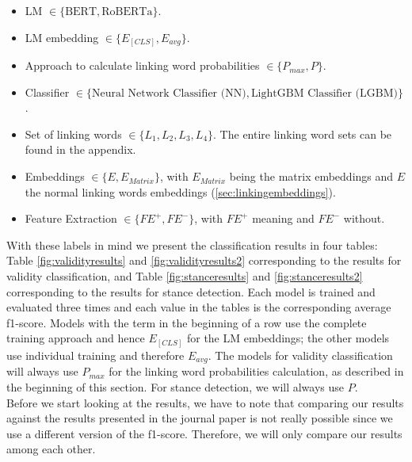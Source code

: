 \begin{itemize}
	\item LM $\in \{\text{BERT}, \text{RoBERTa}\}$.
	\item LM embedding $\in \{E_{[CLS]}, E_{avg}\}$.
	\item Approach to calculate linking word probabilities $\in \{P_{max}, P\}$.
	\item Classifier $\in \{\text{Neural Network Classifier (NN)}, \text{LightGBM Classifier (LGBM)}\}$.
	\item Set of linking words $\in \{L_1, L_2, L_3, L_4\}$. The entire linking word sets can be found in the appendix.
	\item Embeddings $\in \{E, E_{Matrix}\}$, with $E_{Matrix}$ being the matrix embeddings and $E$ the normal linking words embeddings (\ref{sec:linkingembeddings}).
	\item Feature Extraction $\in \{\textit{FE}^+, \textit{FE}^-\}$, with $\textit{FE}^+$ meaning  and $\textit{FE}^-$ without.
\end{itemize}
With these labels in mind we present the classification results in four tables: Table \ref{fig:validityresults} and \ref{fig:validityresults2} corresponding to the results for validity classification, and Table \ref{fig:stanceresults} and \ref{fig:stanceresults2} corresponding to the results for stance detection. Each model is trained and evaluated three times and each value in the tables is the corresponding average f1-score. Models with the term  in the beginning of a row use the complete training approach and hence $E_{[CLS]}$ for the LM embeddings; the other models use individual training and therefore $E_{avg}$. The models for validity classification will always use $P_{max}$ for the linking word probabilities calculation, as described in the beginning of this section. For stance detection, we will always use $P$. \\

Before we start looking at the results, we have to note that comparing our results against the results presented in the journal paper \cite{argsvalidnovel2022} is not really possible since we use a different version of the f1-score. Therefore, we will only compare our results among each other.

